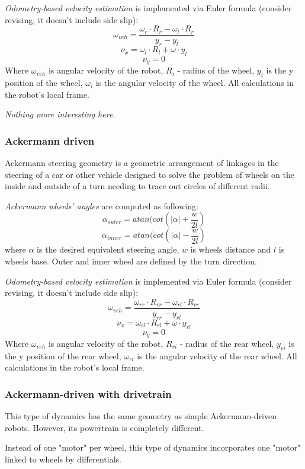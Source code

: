 \documentclass[a4paper,11pt]{article}
\begin{document}
\textit{Odometry-based velocity estimation} is implemented via Euler formula (consider revising, it doesn't include side slip):
\[
\omega_{veh} = \frac{\omega_r \cdot R_r - \omega_l \cdot R_r}{y_r - y_l}
\]
\[
\nu_x = \omega_l \cdot R_l + \omega \cdot y_l
\]
\[
\nu_y = 0
\]
Where $\omega_{veh}$ is angular velocity of the robot, $R_i$ - radius of the wheel, $y_i$ is the y position of the wheel, $\omega_i$ is the angular velocity of the wheel. All calculations in the robot's local frame. 

\textit{Nothing more interesting here.}
\subsubsection{Ackermann driven}

Ackermann steering geometry is a geometric arrangement of linkages in the steering of a car or other vehicle designed to solve the problem of wheels on the inside and outside of a turn needing to trace out circles of different radii.

\textit{Ackermann wheels' angles }are computed as following:
\[
\alpha_{outer} = atan(cot(|\alpha| + \frac{w}{2l})
\]
\[
\alpha_{inner} = atan(cot(|\alpha| - \frac{w}{2l})
\]
where $\alpha$ is the desired equivalent steering angle, $w$ is wheels distance and $l$ is wheels base.
Outer and inner wheel are defined by the turn direction.



\textit{Odometry-based velocity estimation} is implemented via Euler formula (consider revising, it doesn't include side slip):
\[
\omega_{veh} = \frac{\omega_{rr} \cdot R_{rr} - \omega_{rl} \cdot R_{rr}}{y_{rr} - y_{rl}}
\]
\[
\nu_x = \omega_{rl} \cdot R_{rl} + \omega \cdot y_{rl}
\]
\[
\nu_y = 0
\]
Where $\omega_{veh}$ is angular velocity of the robot, $R_{ri}$ - radius of the rear wheel, $y_{ri}$ is the y position of the rear wheel, $\omega_{ri}$ is the angular velocity of the rear wheel. All calculations in the robot's local frame. 


\subsubsection{Ackermann-driven with drivetrain} \label{sec:ackermann_drivetrain}

This type of dynamics has the same geometry as simple Ackermann-driven robots. However, its powertrain is completely different. 

Instead of one "motor" per wheel, this type of dynamics incorporates one "motor" linked to wheels by differentials. 
\end{document}
